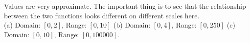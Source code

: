 \documentclass[11pt]{exam}
\begin{document}
\begin{questions}
\begin{figure}[h]
	\end{figure}
\begin{solution}
  Values are very approximate. The important thing is to see that
  the relationship between the two functions looks different on different scales here.\\
  (a) Domain: \([0,2]\), Range: \([0,10]\) (b) Domain: \([0,4]\),
  Range: \([0,250]\) (c) Domain: \([0,10]\), Range: \([0,100000]\).
\end{solution}
\end{questions}
\end{document}
